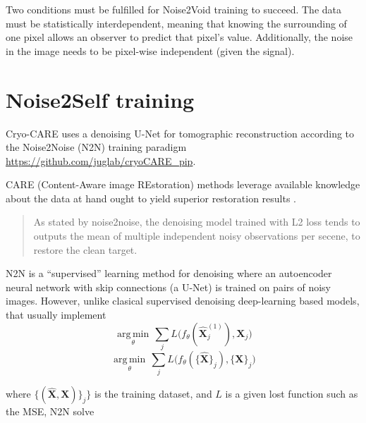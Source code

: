 Two conditions must be fulfilled for Noise2Void training to
succeed. The data must be statistically interdependent, meaning that
knowing the surrounding of one pixel allows an observer to predict
that pixel’s value. Additionally, the noise in the image needs to be
pixel-wise independent (given the signal). %

\section{Noise2Self training}


Cryo-CARE \cite{buchholz2019cryo} uses a denoising U-Net for
tomographic reconstruction according to the Noise2Noise (N2N)
\cite{lehtinen2018noise2noise} training paradigm
\url{https://github.com/juglab/cryoCARE_pip}.

CARE (Content-Aware image REstoration) methods leverage available
knowledge about the data at hand ought to yield superior restoration
results \cite{weigert2018content}.

\begin{quote}
  As stated by noise2noise, the denoising model trained with L2 loss tends to outputs the mean of multiple independent noisy observations per secene, to restore the clean target.
\end{quote}

N2N is a ``supervised'' learning method for denoising where an
autoencoder neural network with skip connections (a U-Net) is trained
on pairs of noisy images. However, unlike clasical supervised
denoising deep-learning based models, that usually implement
\cite{lehtinen2018noise2noise}
\begin{equation}
  \underset{\theta}{\operatorname{arg\,min}} \, \sum_j L \big(f_\theta(\hat{\mathbf X}_j^{(1)}), {\mathbf X}_j\big)
\end{equation}
\begin{equation}
  \underset{\theta}{\operatorname{arg\,min}} \, \sum_j L \big(f_\theta(\{\hat{\mathbf X}\}_j), \{{\mathbf X}\}_j\big)
\end{equation}

where $\{(\hat{\mathbf{X}}, \mathbf{X})\}_j\}$ is the training
dataset, and $L$ is a given lost function such as the MSE, N2N solve

